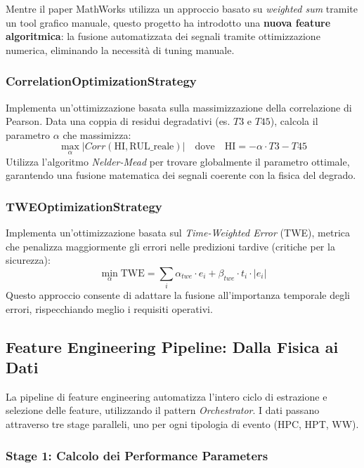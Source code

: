 Mentre il paper MathWorks utilizza un approccio basato su \textit{weighted sum} tramite un tool grafico manuale, questo progetto ha introdotto una \textbf{nuova feature algoritmica}: la fusione automatizzata dei segnali tramite ottimizzazione numerica, eliminando la necessità di tuning manuale.

\subsubsection{CorrelationOptimizationStrategy}

Implementa un'ottimizzazione basata sulla massimizzazione della correlazione di Pearson. Data una coppia di residui degradativi (es. $T3$ e $T45$), calcola il parametro $\alpha$ che massimizza:
\begin{equation}
\max_{\alpha} |Corr(\text{HI}, \text{RUL\_reale})| \quad \text{dove} \quad \text{HI} = -\alpha \cdot T3 - T45
\end{equation}
Utilizza l'algoritmo \textit{Nelder-Mead} per trovare globalmente il parametro ottimale, garantendo una fusione matematica dei segnali coerente con la fisica del degrado.

\subsubsection{TWEOptimizationStrategy}

Implementa un'ottimizzazione basata sul \textit{Time-Weighted Error} (TWE), metrica che penalizza maggiormente gli errori nelle predizioni tardive (critiche per la sicurezza):
\begin{equation}
\min_{\alpha} \text{TWE} = \sum_{i} \alpha_{twe} \cdot e_i + \beta_{twe} \cdot t_i \cdot |e_i|
\end{equation}
Questo approccio consente di adattare la fusione all'importanza temporale degli errori, rispecchiando meglio i requisiti operativi.

\subsection{Feature Engineering Pipeline: Dalla Fisica ai Dati}

La pipeline di feature engineering automatizza l'intero ciclo di estrazione e selezione delle feature, utilizzando il pattern \textit{Orchestrator}. I dati passano attraverso tre stage paralleli, uno per ogni tipologia di evento (HPC, HPT, WW).

\subsubsection{Stage 1: Calcolo dei Performance Parameters}

